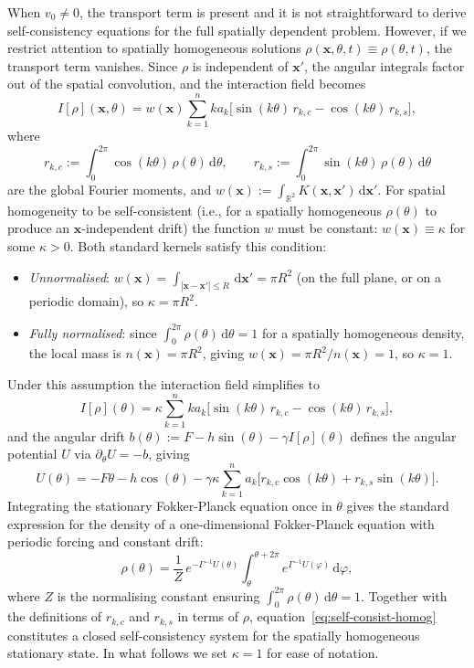 \documentclass[a4paper,11pt]{article}
\theoremstyle{plain}
\theoremstyle{definition}
\theoremstyle{remark}
\newcommand{\R}{\mathbb{R}}
\newcommand{\dd}{\,\mathrm{d}}
\newcommand{\bx}{\mathbf{x}}
\begin{document}
When $v_0 \neq 0$, the transport term is present and it is not straightforward to derive self-consistency equations for the full spatially dependent problem. However, if we restrict attention to spatially homogeneous solutions $\rho(\bx,\theta,t) \equiv \rho(\theta,t)$, the transport term vanishes. Since $\rho$ is independent of $\bx'$, the angular integrals factor out of the spatial convolution, and the interaction field becomes
\[
    I[\rho](\bx,\theta) = w(\bx)\sum_{k=1}^n k a_k \big[\sin(k\theta)\,r_{k,c} - \cos(k\theta)\,r_{k,s}\big],
\]
where
\[
    r_{k,c} := \int_0^{2\pi}\cos(k\theta)\,\rho(\theta)\dd\theta, \qquad r_{k,s} := \int_0^{2\pi}\sin(k\theta)\,\rho(\theta)\dd\theta
\]
are the global Fourier moments, and $w(\bx) := \int_{\R^2} K(\bx,\bx')\dd\bx'$. For spatial homogeneity to be self-consistent (i.e., for a spatially homogeneous $\rho(\theta)$ to produce an $\bx$-independent drift) the function $w$ must be constant: $w(\bx) \equiv \kappa$ for some $\kappa > 0$. Both standard kernels satisfy this condition:
\begin{itemize}
    \item \emph{Unnormalised}: $w(\bx) = \int_{|\bx-\bx'|\leq R}\dd\bx' = \pi R^2$ (on the full plane, or on a periodic domain), so $\kappa = \pi R^2$.
    \item \emph{Fully normalised}: since $\int_0^{2\pi}\rho(\theta)\dd\theta = 1$ for a spatially homogeneous density, the local mass is $n(\bx) = \pi R^2$, giving $w(\bx) = \pi R^2 / n(\bx) = 1$, so $\kappa = 1$.
\end{itemize}
Under this assumption the interaction field simplifies to
\begin{equation*}\label{eq:I-homog}
    I[\rho](\theta) = \kappa\sum_{k=1}^n k a_k \big[\sin(k\theta)\,r_{k,c} - \cos(k\theta)\,r_{k,s}\big],
\end{equation*}
and the angular drift $b(\theta) := F - h\sin(\theta) - \gamma I[\rho](\theta)$ defines the angular potential $U$ via $\partial_\theta U = -b$, giving
\begin{equation*}\label{eq:U-homog}
    U(\theta) = -F\theta - h\cos(\theta) - \gamma\kappa\sum_{k=1}^n a_k\big[r_{k,c}\cos(k\theta) + r_{k,s}\sin(k\theta)\big].
\end{equation*}
Integrating the stationary Fokker-Planck equation once in $\theta$ gives the standard expression for the density of a one-dimensional Fokker-Planck equation with periodic forcing and constant drift:
\begin{equation}\label{eq:self-consist-homog}
    \rho(\theta) = \frac{1}{Z}\,e^{-\Gamma^{-1} U(\theta)} \int_\theta^{\theta + 2\pi} e^{\Gamma^{-1} U(\varphi)}\dd\varphi,
\end{equation}
where $Z$ is the normalising constant ensuring $\int_0^{2\pi}\rho(\theta)\dd\theta = 1$. Together with the definitions of $r_{k,c}$ and $r_{k,s}$ in terms of $\rho$, equation~\eqref{eq:self-consist-homog} constitutes a closed self-consistency system for the spatially homogeneous stationary state. In what follows we set $\kappa = 1$ for ease of notation.
\end{document}

